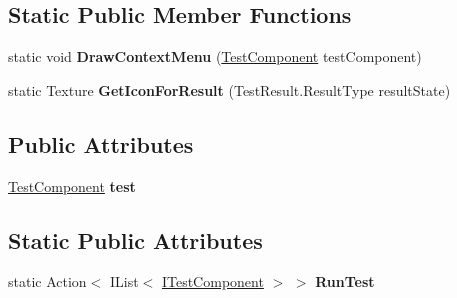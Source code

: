 \subsection*{Static Public Member Functions}
\begin{DoxyCompactItemize}
\item 
\mbox{\label{class_unity_test_1_1_integration_test_renderer_base_aa57b26e5e278af407351c8284bb995be}} 
static void {\bfseries Draw\+Context\+Menu} (\hyperlink{class_unity_test_1_1_test_component}{Test\+Component} test\+Component)
\item 
\mbox{\label{class_unity_test_1_1_integration_test_renderer_base_a48a100e3c6a82af7bf13ec50f09e2b55}} 
static Texture {\bfseries Get\+Icon\+For\+Result} (Test\+Result.\+Result\+Type result\+State)
\end{DoxyCompactItemize}
\subsection*{Public Attributes}
\begin{DoxyCompactItemize}
\item 
\mbox{\label{class_unity_test_1_1_integration_test_renderer_base_a1b2a7894caa1ffc828b6b59d674928a4}} 
\hyperlink{class_unity_test_1_1_test_component}{Test\+Component} {\bfseries test}
\end{DoxyCompactItemize}
\subsection*{Static Public Attributes}
\begin{DoxyCompactItemize}
\item 
\mbox{\label{class_unity_test_1_1_integration_test_renderer_base_af4e9f23341c6cc49db43f36b020bd1d4}} 
static Action$<$ I\+List$<$ \hyperlink{interface_unity_test_1_1_i_test_component}{I\+Test\+Component} $>$ $>$ {\bfseries Run\+Test}
\end{DoxyCompactItemize}
